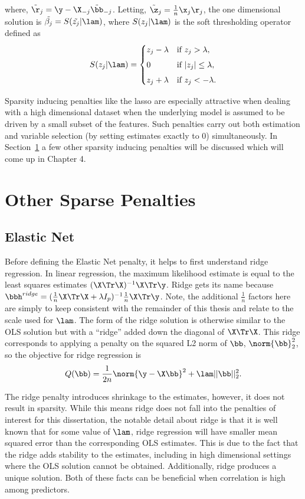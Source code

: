 \noindent where, $\tilde{\r}_j = \y - \X_{-j}\tilde{\bb}_{-j}$. Letting, $\tilde{\z}_j = \tfrac{1}{n}\x_j \r_j$, the one dimensional solution is $\tilde{\beta_j} = S(\tilde{z_j}|\lam)$, where $S(z_j|\lam)$ is the soft thresholding operator defined as 
$$
S(z_j|\lam) =
\begin{cases}
z_j-\lambda & \text{if } z_j>\lambda,\\[4pt]
0          & \text{if } |z_j|\le \lambda,\\[4pt]
z_j+\lambda & \text{if } z_j<-\lambda.
\end{cases}
$$

Sparsity inducing penalties like the lasso are especially attractive when dealing with a high dimensional dataset when the underlying model is assumed to be driven by a small subset of the features. Such penalties carry out both estimation and variable selection (by setting estimates exactly to 0) simultaneously. In Section~\ref{sec:sparse-pen} a few other sparsity inducing penalties will be discussed which will come up in Chapter 4.

\section{Other Sparse Penalties}
\label{sec:sparse-pen}

\subsection{Elastic Net}

Before defining the Elastic Net penalty, it helps to first understand ridge regression. In linear regression, the maximum likelihood estimate is equal to the least squares estimates $(\X\Tr \X)^{-1} \X\Tr \y$. Ridge gets its name because $\bbh^{ridge} = (\frac{1}{n}\X\Tr\X + \lambda I_p)^{-1} \frac{1}{n} \X\Tr \y$. Note, the additional $\frac{1}{n}$ factors here are simply to keep consistent with the remainder of this thesis and relate to the scale used for $\lam$. The form of the ridge solution is otherwise similar to the OLS solution but with a ``ridge'' added down the diagonal of $\X\Tr \X$. This ridge corresponds to applying a penalty on the squared L2 norm of $\bb$, $\norm{\bb}_2^2$, so the objective for ridge regression is
$$
Q(\bb) = \frac{1}{2n}\norm{\y - \X\bb}^2 + \lam ||\bb||^2_2.
$$

The ridge penalty introduces shrinkage to the estimates, however, it does not result in sparsity. While this means ridge does not fall into the penalties of interest for this dissertation, the notable detail about ridge is that it is well known that for some value of $\lam$, ridge regression will have smaller mean squared error than the corresponding OLS estimates. This is due to the fact that the ridge adds stability to the estimates, including in high dimensional settings where the OLS solution cannot be obtained. Additionally, ridge produces a unique solution. Both of these facts can be beneficial when correlation is high among predictors.

